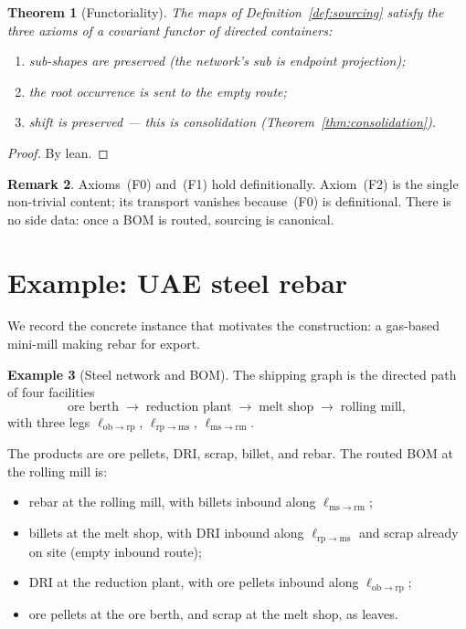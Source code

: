 \documentclass[11pt,a4paper]{article}
\theoremstyle{plain}
\newtheorem{theorem}{Theorem}[section]
\theoremstyle{definition}
\newtheorem{example}[theorem]{Example}
\newtheorem{remark}[theorem]{Remark}
\begin{document}
\begin{theorem}[Functoriality]\label{thm:functor}
The maps of Definition~\ref{def:sourcing} satisfy the three axioms of a
covariant functor of directed containers:
\begin{enumerate}
  \item[\textup{(F0)}] sub-shapes are preserved (the network's sub is
        endpoint projection);
  \item[\textup{(F1)}] the root occurrence is sent to the empty route;
  \item[\textup{(F2)}] shift is preserved --- this is consolidation
        (Theorem~\ref{thm:consolidation}).
\end{enumerate}
\end{theorem}

\begin{proof}
By lean.
\end{proof}

\begin{remark}
Axioms~(F0) and~(F1) hold definitionally. Axiom~(F2) is the single
non-trivial content; its transport vanishes because~(F0) is
definitional. There is no side data: once a BOM is routed, sourcing is
canonical.
\end{remark}

\section{Example: UAE steel rebar}

We record the concrete instance that motivates the construction: a
gas-based mini-mill making rebar for export.

\begin{example}[Steel network and BOM]\label{ex:steel}
The shipping graph is the directed path of four facilities
\[
  \text{ore berth}
  \;\longrightarrow\;
  \text{reduction plant}
  \;\longrightarrow\;
  \text{melt shop}
  \;\longrightarrow\;
  \text{rolling mill},
\]
with three legs $\ell_{\mathrm{ob}\to\mathrm{rp}}$,
$\ell_{\mathrm{rp}\to\mathrm{ms}}$,
$\ell_{\mathrm{ms}\to\mathrm{rm}}$.

The products are ore pellets, DRI, scrap, billet, and rebar. The routed
BOM at the rolling mill is:
\begin{itemize}
  \item rebar at the rolling mill, with billets inbound along
        $\ell_{\mathrm{ms}\to\mathrm{rm}}$;
  \item billets at the melt shop, with DRI inbound along
        $\ell_{\mathrm{rp}\to\mathrm{ms}}$ and scrap already on site
        (empty inbound route);
  \item DRI at the reduction plant, with ore pellets inbound along
        $\ell_{\mathrm{ob}\to\mathrm{rp}}$;
  \item ore pellets at the ore berth, and scrap at the melt shop, as
        leaves.
\end{itemize}
\end{example}
\end{document}
